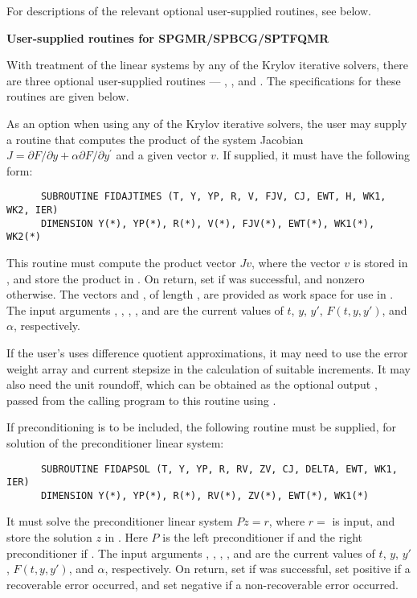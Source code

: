 \begin{Steps}
  For descriptions of the relevant optional user-supplied routines, see 
  below.


  {\s}{\p} {\bf User-supplied routines for SPGMR/SPBCG/SPTFQMR}

  With treatment of the linear systems by any of the Krylov iterative
  solvers, there are three optional user-supplied routines ---
  , , and .  The specifications
  for these routines are given below.

  As an option when using any of the Krylov iterative solvers, the user may
  supply a routine that computes the product of the system Jacobian
  $J = \partial F / \partial y + \alpha \partial F / \partial y^\prime$
  and a given vector $v$.  If supplied, it must have the following form:
\begin{verbatim}
      SUBROUTINE FIDAJTIMES (T, Y, YP, R, V, FJV, CJ, EWT, H, WK1, WK2, IER)
      DIMENSION Y(*), YP(*), R(*), V(*), FJV(*), EWT(*), WK1(*), WK2(*)
\end{verbatim}
  This routine must compute the product vector $Jv$, where the vector $v$ is
  stored in , and store the product in .  On return, set
   if  was successful, and nonzero otherwise.
  The vectors  and , of length , are
  provided as work space for use in .
  The input arguments , , , , and  are the
  current values of $t$, $y$, $y'$, $F(t,y,y')$, and $\alpha$, respectively.

  If the user's  uses difference quotient approximations, it
  may need to use the error weight array  and current stepsize 
  in the calculation of suitable increments.  It may also need the unit
  roundoff, which can be obtained as the optional output ,
  passed from the calling program to this routine using .

  If preconditioning is to be included, the following routine must be
  supplied, for solution of the preconditioner linear system:
\begin{verbatim}
      SUBROUTINE FIDAPSOL (T, Y, YP, R, RV, ZV, CJ, DELTA, EWT, WK1, IER)
      DIMENSION Y(*), YP(*), R(*), RV(*), ZV(*), EWT(*), WK1(*)
\end{verbatim}
  It must solve the preconditioner linear system $Pz = r$, where $r =$  
  is input, and store the solution $z$ in . Here $P$ is the left 
  preconditioner if  and the right preconditioner if .
  The input arguments , , , , and  are the
  current values of $t$, $y$, $y'$, $F(t,y,y')$, and $\alpha$, respectively.
  On return, set  if  was successful, set 
  positive if a recoverable error occurred, and set  negative if a 
  non-recoverable error occurred.


\end{Steps}
